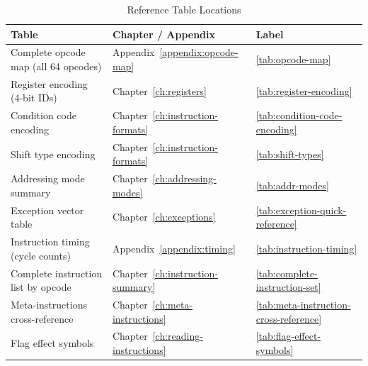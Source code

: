 \begin{table}[H]
	\centering
	\begin{tabular}{lll}
		\toprule
		\textbf{Table}                       & \textbf{Chapter / Appendix}           & \textbf{Label}                             \\
		\midrule
		Complete opcode map (all 64 opcodes) & Appendix~\ref{appendix:opcode-map}    & \ref{tab:opcode-map}                       \\
		Register encoding (4-bit IDs)        & Chapter~\ref{ch:registers}            & \ref{tab:register-encoding}                \\
		Condition code encoding              & Chapter~\ref{ch:instruction-formats}  & \ref{tab:condition-code-encoding}          \\
		Shift type encoding                  & Chapter~\ref{ch:instruction-formats}  & \ref{tab:shift-types}                      \\
		Addressing mode summary              & Chapter~\ref{ch:addressing-modes}     & \ref{tab:addr-modes}                       \\
		Exception vector table               & Chapter~\ref{ch:exceptions}           & \ref{tab:exception-quick-reference}        \\
		Instruction timing (cycle counts)    & Appendix~\ref{appendix:timing}        & \ref{tab:instruction-timing}               \\
		Complete instruction list by opcode  & Chapter~\ref{ch:instruction-summary}  & \ref{tab:complete-instruction-set}         \\
		Meta-instructions cross-reference    & Chapter~\ref{ch:meta-instructions}    & \ref{tab:meta-instruction-cross-reference} \\
		Flag effect symbols                  & Chapter~\ref{ch:reading-instructions} & \ref{tab:flag-effect-symbols}              \\
		\bottomrule
	\end{tabular}
	\caption{Reference Table Locations}
	\label{tab:table-locations}
\end{table}
